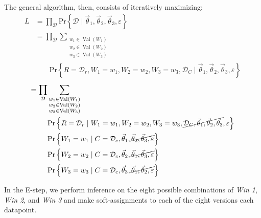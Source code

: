 \documentclass[10pt,twocolumn]{article}
\newcommand{\prb}[1]{\ensuremath{  \mathrm{Pr}\left\{ #1 \right\}  }}
\begin{document}
The general algorithm, then, consists of iteratively maximizing:
\begin{align*}
L &= \prod_{\mathcal{D}} \prb{\mathcal{D} \mid \vec \theta_1,\vec \theta_2,\vec \theta_3, \varepsilon}
\\ &=
\prod_{\mathcal{D}}
\sum_{\substack{w_1 \in \operatorname{Val}\left(W_1\right) \\ w_2 \in \operatorname{Val}\left(W_2\right) \\ w_3 \in \operatorname{Val}\left(W_3\right)}}
\\ & \quad \quad \prb{R = \mathcal{D}_r, W_1 = w_1, W_2 = w_2, W_3 = w_3, \mathcal{D}_C \mid \vec \theta_1,\vec \theta_2,\vec \theta_3, \varepsilon}
\end{align*}%
\begin{align*}
= \prod_{\mathcal{D}}
 & \sum_{\substack{w_1 \in \operatorname{Val}\left(W_1\right) \\ w_2 \in \operatorname{Val}\left(W_2\right) \\ w_3 \in \operatorname{Val}\left(W_3\right)}}
\\ & \prb{R = \mathcal{D}_r \mid W_1 = w_1, W_2 = w_2, W_3 = w_3, \cancel{ \mathcal{D}_C, \vec \theta_1,\vec \theta_2,\vec \theta_3}, \varepsilon}
\\ & \prb{W_1 = w_1 \mid  C = \mathcal{D}_c, \vec\theta_1, \cancel{\vec \theta_2,\vec \theta_3, \varepsilon}}
\\ & \prb{W_2 = w_2 \mid  C = \mathcal{D}_c, \vec\theta_2, \cancel{\vec \theta_1,\vec \theta_3, \varepsilon}}
\\ & \prb{W_3 = w_3 \mid  C = \mathcal{D}_c, \vec\theta_3, \cancel{\vec \theta_1,\vec \theta_2, \varepsilon}}
\end{align*}%

In the E-step, we perform inference on the eight possible combinations of \emph{Win 1}, \emph{Win 2}, and \emph{Win 3} and make soft-assignments to each of the eight versions each datapoint.
\end{document}
